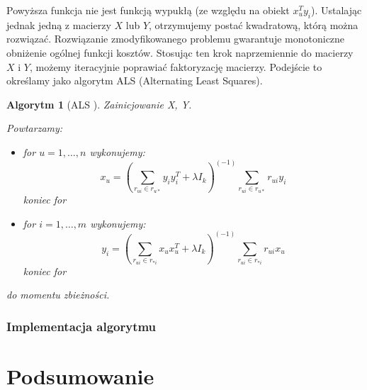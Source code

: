 \documentclass[12pt,a4paper]{report}
\newtheorem{algorytm}[df]{Algorytm}
\begin{document}
Powyższa funkcja nie jest funkcją wypukłą (ze względu na obiekt $x_u^Ty_i$). Ustalając jednak jedną z macierzy $X$ lub $Y$, otrzymujemy postać kwadratową, którą można rozwiązać. Rozwiązanie zmodyfikowanego problemu gwarantuje monotoniczne obniżenie ogólnej funkcji kosztów. Stosując ten krok naprzemiennie do macierzy $X$ i $Y$, możemy iteracyjnie poprawiać faktoryzację macierzy. Podejście to określamy jako algorytm ALS (Alternating Least Squares).

\begin{algorytm}[ALS {\citep{mcvals}}]
Zainicjowanie X, Y.

Powtarzamy:
\begin{itemize}
\item for $u = 1, \ldots, n $ wykonujemy: 
$$
x_u = (\sum_{r_{ui} \in r_{u*}} y_i y_i^T + \lambda I_k)^{(-1)} \sum_{r_{ui} \in r_{u*}} r_{ui}y_i
$$
koniec for
\item for $i = 1, \ldots, m$ wykonujemy:
$$
y_i = (\sum_{r_{ui} \in r_{*i}} x_u x_u^T + \lambda I_k)^{(-1)} \sum_{r_{ui} \in r_{*i}} r_{ui}x_u
$$
koniec for
\end{itemize}
do momentu zbieżności.
\end{algorytm}
\subsection{Implementacja algorytmu}
\chapter{Podsumowanie}



\nocite{*} %


\end{document}
